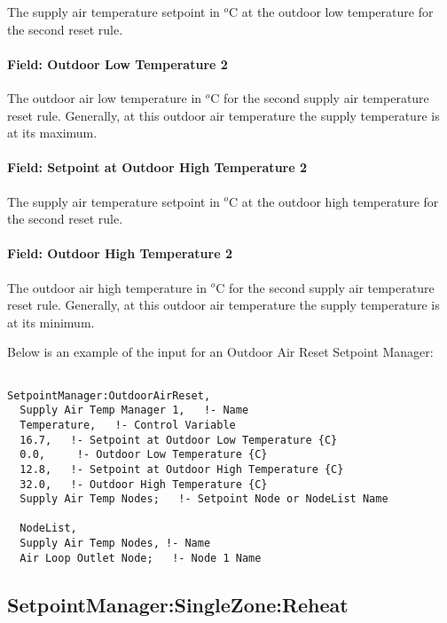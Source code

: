 The supply air temperature setpoint in \(^{o}\)C at the outdoor low temperature for the second reset rule.

\paragraph{Field: Outdoor Low Temperature 2}\label{field-outdoor-low-temperature-2}

The outdoor air low temperature in \(^{o}\)C for the second supply air temperature reset rule. Generally, at this outdoor air temperature the supply temperature is at its maximum.

\paragraph{Field: Setpoint at Outdoor High Temperature 2}\label{field-setpoint-at-outdoor-high-temperature-2}

The supply air temperature setpoint in \(^{o}\)C at the outdoor high temperature for the second reset rule.

\paragraph{Field: Outdoor High Temperature 2}\label{field-outdoor-high-temperature-2}

The outdoor air high temperature in \(^{o}\)C for the second supply air temperature reset rule. Generally, at this outdoor air temperature the supply temperature is at its minimum.

Below is an example of the input for an Outdoor Air Reset Setpoint Manager:

\begin{lstlisting}

SetpointManager:OutdoorAirReset,
  Supply Air Temp Manager 1,   !- Name
  Temperature,   !- Control Variable
  16.7,   !- Setpoint at Outdoor Low Temperature {C}
  0.0,     !- Outdoor Low Temperature {C}
  12.8,   !- Setpoint at Outdoor High Temperature {C}
  32.0,   !- Outdoor High Temperature {C}
  Supply Air Temp Nodes;   !- Setpoint Node or NodeList Name

  NodeList,
  Supply Air Temp Nodes, !- Name
  Air Loop Outlet Node;   !- Node 1 Name
\end{lstlisting}

\subsection{SetpointManager:SingleZone:Reheat}\label{setpointmanagersinglezonereheat}

